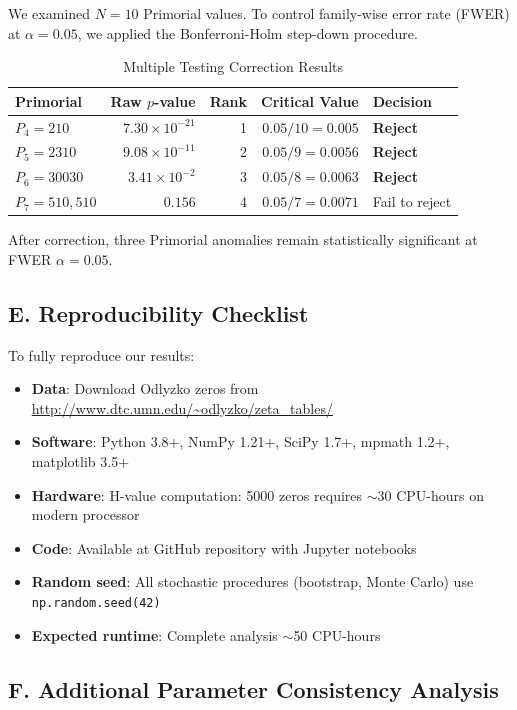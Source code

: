 \documentclass[12pt]{article}
\begin{document}
We examined $N = 10$ Primorial values. To control family-wise error rate (FWER) at $\alpha = 0.05$, we applied the Bonferroni-Holm step-down procedure.

\begin{table}[htbp]
\centering
\caption{Multiple Testing Correction Results}
\label{tab:multiple_testing}
\small
\begin{tabular}{@{}lrrrl@{}}
\toprule
Primorial & Raw $p$-value & Rank & Critical Value & Decision \\
\midrule
$P_4 = 210$ & $7.30 \times 10^{-21}$ & 1 & $0.05/10 = 0.005$ & \textbf{Reject} \\
$P_5 = 2310$ & $9.08 \times 10^{-11}$ & 2 & $0.05/9 = 0.0056$ & \textbf{Reject} \\
$P_6 = 30030$ & $3.41 \times 10^{-2}$ & 3 & $0.05/8 = 0.0063$ & \textbf{Reject} \\
$P_7 = 510{,}510$ & $0.156$ & 4 & $0.05/7 = 0.0071$ & Fail to reject \\
\bottomrule
\end{tabular}
\end{table}

After correction, three Primorial anomalies remain statistically significant at FWER $\alpha = 0.05$.

\subsection*{E. Reproducibility Checklist}

To fully reproduce our results:

\begin{itemize}
\item \textbf{Data}: Download Odlyzko zeros from \url{http://www.dtc.umn.edu/~odlyzko/zeta_tables/}
\item \textbf{Software}: Python 3.8+, NumPy 1.21+, SciPy 1.7+, mpmath 1.2+, matplotlib 3.5+
\item \textbf{Hardware}: H-value computation: 5000 zeros requires $\sim$30 CPU-hours on modern processor
\item \textbf{Code}: Available at GitHub repository with Jupyter notebooks
\item \textbf{Random seed}: All stochastic procedures (bootstrap, Monte Carlo) use \texttt{np.random.seed(42)}
\item \textbf{Expected runtime}: Complete analysis $\sim$50 CPU-hours
\end{itemize}

\subsection*{F. Additional Parameter Consistency Analysis}
\end{document}
